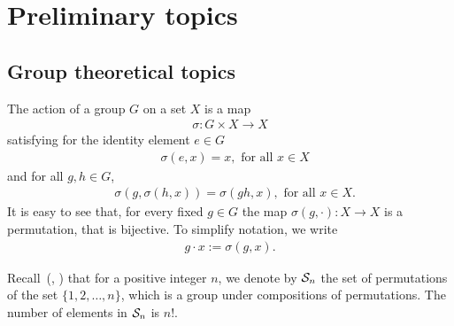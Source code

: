 \clearpage{\thispagestyle{empty}}
\section{Preliminary topics}

\subsection{Group theoretical topics}


The action of a group $G$ on a set $X$ is a map
\begin{align*}
	\sigma : G \times X \rightarrow X
\end{align*}
satisfying for the identity element $e \in G$ 
\begin{align*}
	&\sigma(e,x) = x, \text{ for all $x \in X$}
\end{align*}
and for all $g,h \in G$,
\begin{align*}
	&\sigma (g, \sigma(h,x)) = \sigma(gh, x), \text{ for all } x \in X.
\end{align*}
It is easy to see that, for every fixed $g \in G$ the map $\sigma(g, \cdot): X \rightarrow X$ is a permutation, that is bijective. To simplify notation, we write
\begin{align*}
	g \cdot x := \sigma(g,x).
\end{align*}

%


Recall~(\cite[1.3.]{DummitFoote}, \cite[1.1]{Sagan}) that for a positive integer $n$, we denote by $\mathcal{S}_n$ the set of permutations of the set $\{1, 2, \dots, n\}$, which is a group under compositions of permutations. The number of elements in $\mathcal{S}_n$ is $n!$.

